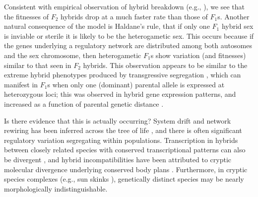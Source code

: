 \documentclass{article}
\newcommand{\plr}[1]{\todo[color=blue!25]{#1}}
\newcommand{\plr}[1]{{\color{blue}\it #1}}
\newcommand{\1}{\mathbbm{1}}
\begin{document}
Consistent with empirical observation of hybrid breakdown (e.g., \citet{plotner2017chlorosis}), 
we see that the fitnesses of $F_2$ hybrids drop at a much faster rate than those of $F_1$s.
Another natural consequence of the model is Haldane's rule,
that if only one $F_1$ hybrid sex is inviable or sterile it is likely to be the heterogametic sex.
This occurs because if the genes underlying a regulatory network are distributed among both autosomes and the sex chromosome, 
then heterogametic $F_1$s show variation (and fitnesses) similar to that seen in $F_2$ hybrids.
This observation appears to be similar to the extreme hybrid phenotypes produced by transgressive segregation \citep{rieseberg1999transgressive}, 
which can manifest in $F_1$s when only one (dominant) parental allele is expressed at heterozygous loci; this was observed in hybrid gene expression patterns, and increased as a function of parental genetic distance \citep{stelkens2009genetic}.

Is there evidence that this is actually occurring?
System drift and network rewiring has been inferred across the tree of life \citep{wotton2015quantitative, crombach2016gap, dalal2017transcription, johnson2017rewiring, ali2017quantitative},
and there is often significant regulatory variation segregating within populations.
Transcription in hybrids between closely related species with conserved transcriptional patterns can also be divergent 
\citep{haerty2006gene, maheshwari2012cis, coolon2014tempo, michalak2004association, mack2016gene}, and hybrid incompatibilities have been attributed to cryptic molecular divergence underlying conserved body plans \citep{gavin2013embryonic}. 
Furthermore, in cryptic species complexes (e.g., sun skinks \citep{barley2013challenge}),
genetically distinct species
may be nearly morphologically indistinguishable.
\end{document}
